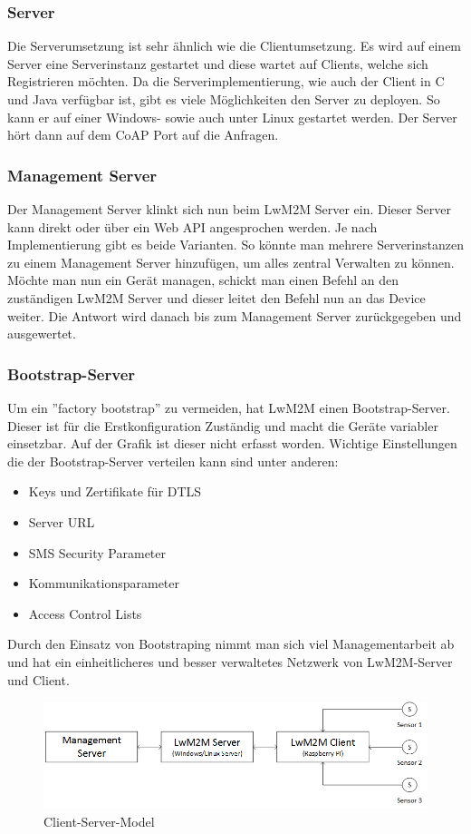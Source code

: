 \subsubsection{Server}
Die Serverumsetzung ist sehr ähnlich wie die Clientumsetzung. Es wird auf einem Server eine Serverinstanz gestartet und diese wartet auf Clients, welche sich Registrieren möchten. Da die Serverimplementierung, wie auch der Client in C und Java verfügbar ist, gibt es viele Möglichkeiten den Server zu deployen. So kann er auf einer Windows- sowie auch unter Linux gestartet werden. Der Server hört dann auf dem CoAP Port auf die Anfragen.
\subsubsection{Management Server}
Der Management Server klinkt sich nun beim LwM2M Server ein. Dieser Server kann direkt oder über ein Web API angesprochen werden. Je nach Implementierung gibt es beide Varianten. So könnte man mehrere Serverinstanzen zu einem Management Server hinzufügen, um alles zentral Verwalten zu können. Möchte man nun ein Gerät managen, schickt man einen Befehl an den zuständigen LwM2M Server und dieser leitet den Befehl nun an das Device weiter. Die Antwort wird danach bis zum Management Server zurückgegeben und ausgewertet. 
\subsubsection{Bootstrap-Server}
Um ein ''factory bootstrap'' zu vermeiden, hat LwM2M einen Bootstrap-Server. Dieser ist für die Erstkonfiguration Zuständig und macht die Geräte variabler einsetzbar. Auf der Grafik ist dieser nicht erfasst worden. Wichtige Einstellungen die der Bootstrap-Server verteilen kann sind unter anderen\cite{BootstrapFeatures}:
\begin{itemize}
\item Keys  und Zertifikate für DTLS
\item Server URL
\item SMS Security Parameter
\item Kommunikationsparameter
\item Access Control Lists
\end{itemize}
Durch den Einsatz von Bootstraping nimmt man sich viel Managementarbeit ab und hat ein einheitlicheres und besser verwaltetes Netzwerk von LwM2M-Server und Client.
\begin{figure}[H]
\includegraphics[scale=0.5]{../02_Analyse/images/lwm2m/server_client_model.png}
\caption{Client-Server-Model}
\end{figure}
